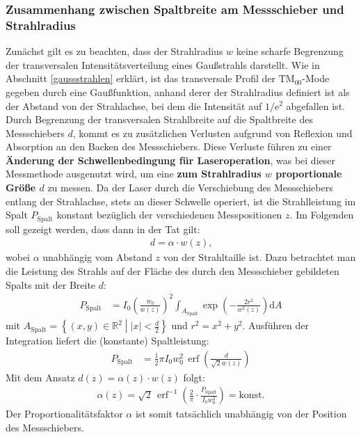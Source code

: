 \documentclass[11pt, a4paper]{article}
\numberwithin{equation}{section}
\DeclareMathOperator{\erf}{erf}
\begin{document}
\subsubsection{Zusammenhang zwischen Spaltbreite am Messschieber und Strahlradius}
\label{sssec:spaltbreite_strahlradius}
Zunächst gilt es zu beachten, dass der Strahlradius $w$ keine scharfe Begrenzung der transversalen Intensitätsverteilung eines Gaußstrahls darstellt.
Wie in Abschnitt \ref{gaussstrahlen} erklärt, ist das transversale Profil der $\mathrm{TM}_{00}$-Mode gegeben durch eine Gaußfunktion, anhand derer der Strahlradius definiert ist als der Abstand von der Strahlachse, bei dem die Intensität auf $1/\mathrm{e}^2$ abgefallen ist.
Durch Begrenzung der transversalen Strahlbreite auf die Spaltbreite des Messschiebers $d$, kommt es zu zusätzlichen Verlusten aufgrund von Reflexion und Absorption an den Backen des Messschiebers.
Diese Verluste führen zu einer \textbf{Änderung der Schwellenbedingung für Laseroperation}, was bei dieser Messmethode ausgenutzt wird, um eine \textbf{zum Strahlradius $w$ proportionale Größe $d$} zu messen.
Da der Laser durch die Verschiebung des Messschiebers entlang der Strahlachse, stets an dieser Schwelle operiert, ist die Strahlleistung im Spalt $P_\mathrm{Spalt}$ konstant bezüglich der verschiedenen Messpositionen $z$.
Im Folgenden soll gezeigt werden, dass dann in der Tat gilt:
\begin{align}
	d = \alpha \cdot w(z) \text{,}
\end{align}
wobei $\alpha$ unabhängig vom Abstand $z$ von der Strahltaille ist.
Dazu betrachtet man die Leistung des Strahls auf der Fläche des durch den Messschieber gebildeten Spalts mit der Breite $d$:
\begin{align}
	P_\mathrm{Spalt} &= I_0 \left( \frac{w_0}{w(z)} \right)^2 \int_{A_\mathrm{Spalt}} \exp\left( -\frac{2 r^2}{w^2(z)} \right) \mathrm{d}A
\end{align}
mit $A_\mathrm{Spalt} = \left\{(x,y) \in \mathbb{R}^2 \middle| |x| < \frac{d}{2} \right\}$ und $r^2 = x^2 + y^2$.
Ausführen der Integration liefert die (konstante) Spaltleistung:
\begin{align}
	P_\mathrm{Spalt} &= \frac{1}{2} \pi I_0 w_0^2 \,\erf\left( \frac{d}{\sqrt{2} w(z)} \right)
\end{align}
Mit dem Ansatz $d(z) = \alpha(z) \cdot w(z)$ folgt:
\begin{align}
	\alpha(z) = \sqrt{2} \, \erf^{-1}\left( \frac{2}{\pi} \cdot \frac{P_\mathrm{Spalt}}{I_0 w_0^2}\right) = \mathrm{konst.}
\end{align}
Der Proportionalitätsfaktor $\alpha$ ist somit tatsächlich unabhängig von der Position des Messschiebers.
\end{document}
